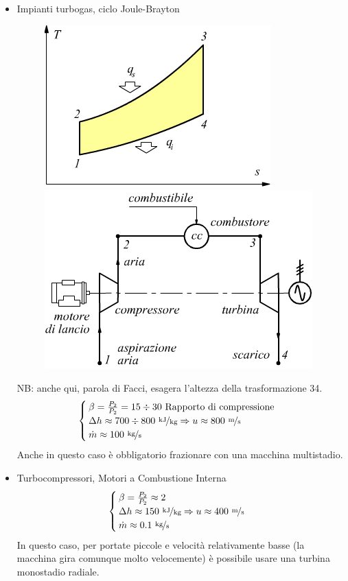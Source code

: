 \documentclass[a4paper, 15pt]{article}
\begin{document}
\begin{adjustwidth}{2in}{}
\begin{itemize}
	\item Impianti turbogas, ciclo Joule-Brayton 
	\begin{figure}[H]
		\centering
		\includegraphics[width=0.4\linewidth]{immagini/BJ}
		\includegraphics[width=0.4\linewidth]{immagini/BJ2}
		\label{fig:BJ}
		\label{fig:BJ2}		
	\end{figure}
	NB: anche qui, parola di Facci, esagera l'altezza della trasformazione 34. 
	\[\begin{cases}
		\beta = {P_2\over P_2} = 15\div30~\text{Rapporto di compressione}\\
		\Delta h \approx 700\div800~\nicefrac{\text{kJ}}{\text{kg}} \Rightarrow u \approx 800~\nicefrac{\text{m}}{\text{s}} \\
		\dot{m} \approx 100~\nicefrac{\text{kg}}{\text{s}}
	\end{cases}\]
	Anche in questo caso è obbligatorio frazionare con una macchina multistadio. 
	
	\item Turbocompressori, Motori a Combustione Interna
	\[\begin{cases}
		\beta = {P_2\over P_2} \approx 2\\
		\Delta h \approx 150~\nicefrac{\text{kJ}}{\text{kg}} \Rightarrow u \approx 400~\nicefrac{\text{m}}{\text{s}} \\
		\dot{m} \approx 0.1~\nicefrac{\text{kg}}{\text{s}}
	\end{cases}\]
	In questo caso, per portate piccole e velocità relativamente basse (la macchina gira comunque molto velocemente) è possibile usare una turbina monostadio radiale. 
	\end{itemize}
\end{adjustwidth}
\end{document}
